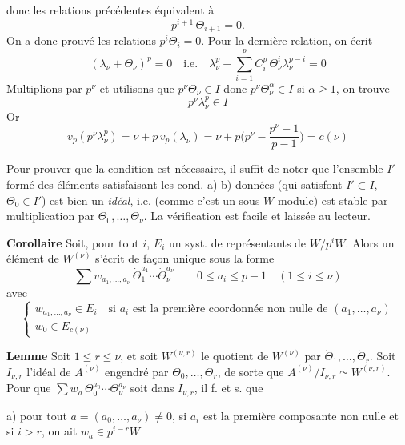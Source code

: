 \documentclass[11pt,a4paper]{article}
\begin{document}

donc les relations précédentes équivalent à
\[
p^{i+1}\,\Theta_{i+1} = 0 .
\]
On a donc prouvé les relations $p^{i}\Theta_i = 0$. Pour la dernière relation, on
écrit
\[
(\lambda_\nu + \Theta_\nu)^{p} = 0 \quad \text{i.e.} \quad
\lambda_\nu^{p} + \sum_{i=1}^{p} C_i^{p}\,\Theta_\nu^{i}\lambda_\nu^{p-i} = 0
\]
Multiplions par $p^{\nu}$ et utilisons que $p^{\nu}\Theta_\nu \in I$ donc
$p^{\nu}\Theta_\nu^{\alpha} \in I$ si $\alpha \geq 1$, on trouve
\[
p^{\nu}\lambda_\nu^{p} \in I
\]
Or \ill{}
\[
v_p(p^{\nu}\lambda_\nu^{p}) = \nu + p\,v_p(\lambda_\nu)
= \nu + p\Big(p^{\nu} - \frac{p^{\nu}-1}{p-1}\Big) = c(\nu)
\]

Pour prouver que la condition est nécessaire, il suffit de noter que l'ensemble
$I'$ formé des éléments satisfaisant les cond. a) b) données (qui satisfont
$I' \subset I$, $\Theta_0 \in I'$) est bien un \emph{idéal}, i.e. \struck{\ill{}}
(comme c'est un sous-$W$-module) est stable par multiplication par
$\Theta_0, \dots, \Theta_\nu$. La vérification est facile et laissée au lecteur.
\marginal{!}

\textbf{Corollaire} \quad Soit, pour tout $i$, $E_i$ un syst. de représentants
de $W/p^{i}W$. Alors un élément de $W^{(\nu)}$ s'écrit de façon unique sous la
forme
\[
\sum w_{a_1, \dots, a_\nu}\, \dot{\Theta}_1^{a_1} \cdots \dot{\Theta}_\nu^{a_\nu}
\qquad 0 \leq a_i \leq p-1 \quad (1 \leq i \leq \nu)
\]
avec
\[
\begin{cases}
w_{a_1, \dots, a_\nu} \in E_i \quad \text{si $a_i$ est la première coordonnée non nulle de } (a_1, \dots, a_\nu) \\
w_0 \in E_{c(\nu)}
\end{cases}
\]



\textbf{Lemme} \quad Soit $1 \leq r \leq \nu$, et soit $W^{(\nu, r)}$ le quotient
de $W^{(\nu)}$ par $\dot{\Theta}_1, \dots, \dot{\Theta}_r$. 
Soit  $I_{\nu, r}$ l'idéal de $A^{(\nu)}$ engendré par
$\Theta_0, \dots, \Theta_r$, de sorte que $A^{(\nu)}/I_{\nu, r} \simeq W^{(\nu, r)}$.
Pour que $\sum w_a\,\Theta_0^{a_0} \cdots \Theta_\nu^{a_\nu}$ soit dans
$I_{\nu, r}$, il f. et s. que

a) pour tout $a = (a_0, \dots, a_\nu) \neq 0$, \struck{\ill{}}
 si $a_i$ est la
première composante non nulle et si $i > r$, on ait \struck{\ill{}}
$w_a \in p^{i-r} W$
\end{document}
